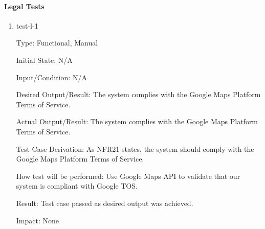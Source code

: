 \documentclass[12pt, titlepage]{article}
\begin{document}
\paragraph{Legal Tests}

\begin{enumerate}

\item{test-l-1\\}

Type: Functional, Manual

Initial State: N/A	

Input/Condition: N/A		

Desired Output/Result:  The system complies with the Google Maps Platform Terms of Service.

Actual Output/Result: The system complies with the Google Maps Platform Terms of Service.

Test Case Derivation: As NFR21 states, the system should comply with the Google Maps Platform Terms of Service.

How test will be performed: Use Google Maps API to validate that our system is compliant with Google TOS. 

Result: Test case passed as desired output was achieved.

Impact: None

\end{enumerate}

\newpage
\end{document}
